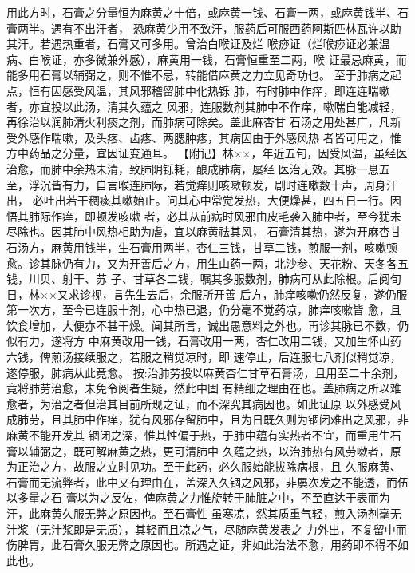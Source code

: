 \documentclass[a4paper,12pt,UTF8,twoside]{ctexbook}
\begin{document}
用此方时，石膏之分量恒为麻黄之十倍，或麻黄一钱、石膏一两，或麻黄钱半、石膏两半。遇有不出汗者， 
恐麻黄少用不致汗，服药后可服西药阿斯匹林瓦许以助其汗。若遇热重者，石膏又可多用。曾治白喉证及烂 
喉痧证（烂喉痧证必兼温病、白喉证，亦多微兼外感），麻黄用一钱，石膏恒重至二两，喉 
证最忌麻黄，而能多用石膏以辅弼之，则不惟不忌，转能借麻黄之力立见奇功也。 
至于肺病之起点，恒有因感受风温，其风邪稽留肺中化热铄 
肺，有时肺中作痒，即连连喘嗽者，亦宜投以此汤，清其久蕴之 
风邪，连服数剂其肺中不作痒，嗽喘自能减轻，再徐治以润肺清火利痰之剂，而肺病可除矣。盖此麻杏甘 
石汤之用处甚广，凡新受外感作喘嗽，及头疼、齿疼、两腮肿疼，其病因由于外感风热 
者皆可用之，惟方中药品之分量，宜因证变通耳。 
【附记】林××，年近五旬，因受风温，虽经医治愈，而肺中余热未清，致肺阴铄耗，酿成肺病，屡经 
医治无效。其脉一息五至，浮沉皆有力，自言喉连肺际，若觉痒则咳嗽顿发，剧时连嗽数十声，周身汗出， 
必吐出若干稠痰其嗽始止。问其心中常觉发热，大便燥甚，四五日一行。因悟其肺际作痒，即顿发咳嗽 
者，必其从前病时风邪由皮毛袭入肺中者，至今犹未尽除也。因其肺中风热相助为虐，宜以麻黄祛其风， 
石膏清其热，遂为开麻杏甘石汤方，麻黄用钱半，生石膏用两半，杏仁三钱，甘草二钱，煎服一剂，咳嗽顿 
愈。诊其脉仍有力，又为开善后之方，用生山药一两，北沙参、天花粉、天冬各五钱，川贝、射干、苏 
子、甘草各二钱，嘱其多服数剂，肺病可从此除根。后阅旬日，林××又求诊视，言先生去后，余服所开善 
后方，肺痒咳嗽仍然反复，遂仍服第一次方，至今已连服十剂，心中热已退，仍分毫不觉药凉，肺痒咳嗽皆 
愈，且饮食增加，大便亦不甚干燥。闻其所言，诚出愚意料之外也。再诊其脉已不数，仍似有力，遂将方 
中麻黄改用一钱，石膏改用一两，杏仁改用二钱，又加生怀山药六钱，俾煎汤接续服之，若服之稍觉凉时，即 
速停止，后连服七八剂似稍觉凉，遂停服，肺病从此竟愈。 
按:治肺劳投以麻黄杏仁甘草石膏汤，且用至二十余剂，竟将肺劳治愈，未免令阅者生疑，然此中固 
有精细之理由在也。盖肺病之所以难愈者，为治之者但治其目前所现之证，而不深究其病因也。如此证原 
以外感受风成肺劳，且其肺中作痒，犹有风邪存留肺中，且为日既久则为锢闭难出之风邪，非麻黄不能开发其 
锢闭之深，惟其性偏于热，于肺中蕴有实热者不宜，而重用生石膏以辅弼之，既可解麻黄之热，更可清肺中 
久蕴之热，以治肺热有风劳嗽者，原为正治之方，故服之立时见功。至于此药，必久服始能拔除病根，且 
久服麻黄、石膏而无流弊者，此中又有理由在，盖深入久锢之风邪，非屡次发之不能透，而伍以多量之石 
膏以为之反佐，俾麻黄之力惟旋转于肺脏之中，不至直达于表而为汗，此麻黄久服无弊之原因也。至石膏性 
虽寒凉，然其质重气轻，煎入汤剂毫无汁浆（无汁浆即是无质），其轻而且凉之气，尽随麻黄发表之 
力外出，不复留中而伤脾胃，此石膏久服无弊之原因也。所遇之证，非如此治法不愈，用药即不得不如此也。 
\end{document}
